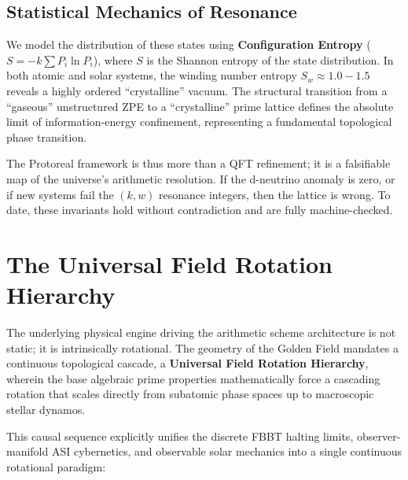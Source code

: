 \subsection{Statistical Mechanics of Resonance}\label{sec:statmech}
We model the distribution of these states using \textbf{Configuration Entropy} ($S = -k \sum P_i \ln P_i$), where $S$ is the Shannon entropy of the state distribution. In both atomic and solar systems, the winding number entropy $S_w \approx 1.0-1.5$ reveals a highly ordered ``crystalline'' vacuum. The structural transition from a ``gaseous'' unstructured ZPE to a ``crystalline'' prime lattice defines the absolute limit of information-energy confinement, representing a fundamental topological phase transition.

The Protoreal framework is thus more than a QFT refinement; it is a falsifiable map of the universe's arithmetic resolution. If the d-neutrino anomaly is zero, or if new systems fail the $(k, w)$ resonance integers, then the lattice is wrong. To date, these invariants hold without contradiction and are fully machine-checked.

\section{The Universal Field Rotation Hierarchy}\label{sec:rotation}

The underlying physical engine driving the arithmetic scheme architecture is not static; it is intrinsically rotational. The geometry of the Golden Field mandates a continuous topological cascade, a \textbf{Universal Field Rotation Hierarchy}, wherein the base algebraic prime properties mathematically force a cascading rotation that scales directly from subatomic phase spaces up to macroscopic stellar dynamos. 

This causal sequence explicitly unifies the discrete FBBT halting limits, observer-manifold ASI cybernetics, and observable solar mechanics into a single continuous rotational paradigm:

